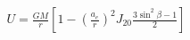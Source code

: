 \documentclass[10pt]{article}
\begin{document}
\begin{align*}U = \frac{G M}{r} \left[ 1 - \left( \frac{a_{e}}{r} \right)^2 J_{20} \frac{ 3 \sin^2 \beta - 1}{2} \right]\end{align*}
\end{document}
